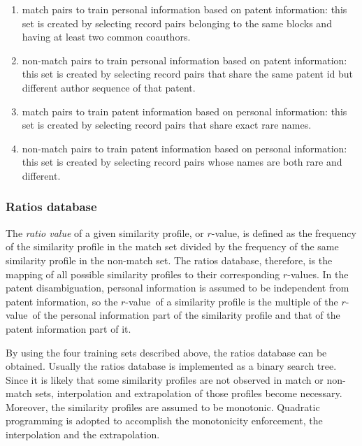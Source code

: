 \documentclass{article}
\newcommand{\rvalue}{$r$-value}
\newcommand{\rvalues}{$r$-values}
\begin{document}
\begin{enumerate}

\item match pairs to train personal information based
on patent information: this set is created by selecting
record pairs belonging to the same blocks and having at
least two common coauthors.

\item non-match pairs to train personal information based
on patent information: this set is created by
selecting record pairs that share the same patent id but
different author sequence of that patent.

\item match pairs to train patent information based on
personal information: this set is created by
selecting record pairs that share exact rare names.

\item non-match pairs to train patent information based on
personal information: this set is created by
selecting record pairs whose names are both rare and different.

\end{enumerate}


\subsubsection{Ratios database}


The \textit{ratio value} of a given similarity profile, or \rvalue,
is defined as the frequency of the similarity profile in the
match set divided by the frequency of the same similarity
profile in the non-match set. The ratios database, therefore,
is the mapping of all possible similarity profiles to
their corresponding \rvalues. In the patent disambiguation,
personal information is assumed to be independent from patent
information, so the \rvalue\ of a similarity profile is the
multiple of the \rvalue\ of the personal information
part of the similarity profile and that of the patent
information part of it.


By using the four training sets
described above, the ratios database can be obtained. Usually
the ratios database is implemented as a binary search tree.
Since it is likely that some similarity profiles are not
observed in match or non-match sets, interpolation and
extrapolation of those profiles become necessary. Moreover, the
similarity profiles are assumed to be monotonic. Quadratic
programming is adopted to accomplish the monotonicity
enforcement, the interpolation and the extrapolation.
\end{document}
